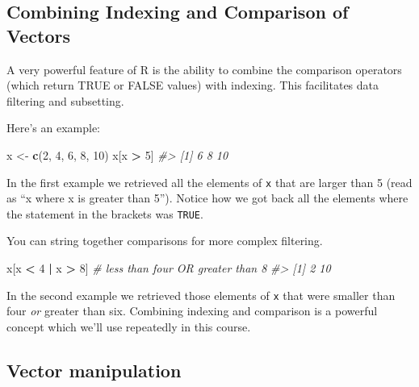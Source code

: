 \documentclass[]{book}
\newenvironment{Shaded}{\begin{snugshade}}{\end{snugshade}}
\newcommand{\CommentTok}[1]{\textcolor[rgb]{0.56,0.35,0.01}{\textit{#1}}}
\newcommand{\DecValTok}[1]{\textcolor[rgb]{0.00,0.00,0.81}{#1}}
\newcommand{\KeywordTok}[1]{\textcolor[rgb]{0.13,0.29,0.53}{\textbf{#1}}}
\newcommand{\NormalTok}[1]{#1}
\newcommand{\OperatorTok}[1]{\textcolor[rgb]{0.81,0.36,0.00}{\textbf{#1}}}
\newcommand{\StringTok}[1]{\textcolor[rgb]{0.31,0.60,0.02}{#1}}
\theoremstyle{definition}
\theoremstyle{definition}
\theoremstyle{definition}
\theoremstyle{remark}
\begin{document}
\hypertarget{combining-indexing-and-comparison-of-vectors}{%
\subsection{Combining Indexing and Comparison of
Vectors}\label{combining-indexing-and-comparison-of-vectors}}

A very powerful feature of R is the ability to combine the comparison
operators (which return TRUE or FALSE values) with indexing. This
facilitates data filtering and subsetting.

Here's an example:

\begin{Shaded}
\begin{Highlighting}[]
\NormalTok{x <-}\StringTok{ }\KeywordTok{c}\NormalTok{(}\DecValTok{2}\NormalTok{, }\DecValTok{4}\NormalTok{, }\DecValTok{6}\NormalTok{, }\DecValTok{8}\NormalTok{, }\DecValTok{10}\NormalTok{) }
\NormalTok{x[x }\OperatorTok{>}\StringTok{ }\DecValTok{5}\NormalTok{]}
\CommentTok{#> [1]  6  8 10}
\end{Highlighting}
\end{Shaded}

In the first example we retrieved all the elements of \texttt{x} that
are larger than 5 (read as ``x where x is greater than 5''). Notice how
we got back all the elements where the statement in the brackets was
\texttt{TRUE}.

You can string together comparisons for more complex filtering.

\begin{Shaded}
\begin{Highlighting}[]
\NormalTok{x[x }\OperatorTok{<}\StringTok{ }\DecValTok{4} \OperatorTok{|}\StringTok{ }\NormalTok{x }\OperatorTok{>}\StringTok{ }\DecValTok{8}\NormalTok{]  }\CommentTok{# less than four OR greater than 8}
\CommentTok{#> [1]  2 10}
\end{Highlighting}
\end{Shaded}

In the second example we retrieved those elements of \texttt{x} that
were smaller than four \emph{or} greater than six. Combining indexing
and comparison is a powerful concept which we'll use repeatedly in this
course.

\hypertarget{vector-manipulation}{%
\subsection{Vector manipulation}\label{vector-manipulation}}
\end{document}
